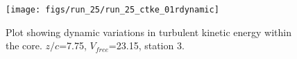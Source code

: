 \begin{figure}[H]
\centering
\texttt{[image: figs/run\_25/run\_25\_ctke\_01rdynamic]}
\caption{Plot showing dynamic variations in turbulent kinetic energy within the core. $z/c$=7.75, $V_{free}$=23.15, station 3.}
\label{fig:run_25_ctke_01rdynamic}
\end{figure}


